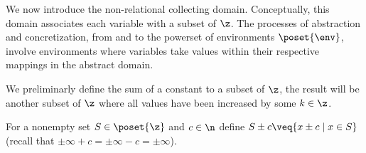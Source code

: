 
We now introduce the non-relational collecting domain. Conceptually,
this domain associates each variable with a subset of \(\z\). The
processes of abstraction and concretization, from and to the powerset
of environments \(\poset{\env}\), involve environments where
variables take values within their respective mappings in the abstract
domain.

We preliminarly define the sum of a constant to a subset of \(\z\),
the result will be another subset of \(\z\) where all values have been
increased by some \(k\in\z\).
\begin{definition}
  For a nonempty set \(S \in \poset{\z}\) and \(c \in \n\) define
  \(S \pm c \veq \{x \pm c \mid x \in S\}\) (recall
  that \(\pm \infty + c = \pm\infty - c = \pm\infty\)).
\end{definition}

